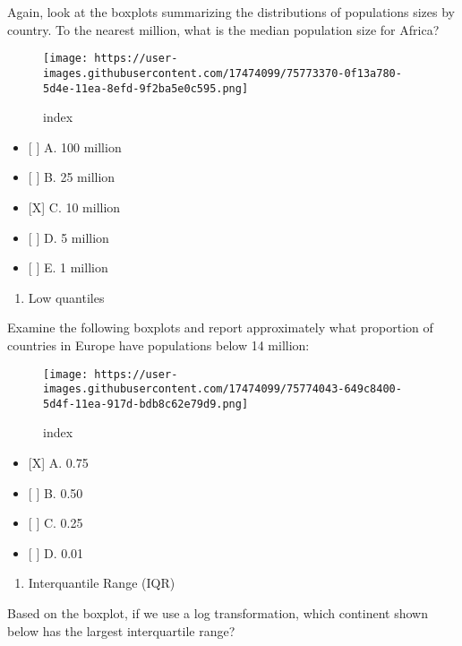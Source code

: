 \documentclass[]{article}
\providecommand{\tightlist}{%
  \setlength{\itemsep}{0pt}\setlength{\parskip}{0pt}}
\begin{document}
Again, look at the boxplots summarizing the distributions of populations
sizes by country. To the nearest million, what is the median population
size for Africa?

\begin{figure}
\centering
\texttt{[image: https://user-images.githubusercontent.com/17474099/75773370-0f13a780-5d4e-11ea-8efd-9f2ba5e0c595.png]}
\caption{index}
\end{figure}

\begin{itemize}
\tightlist
\item
  {[} {]} A. 100 million
\item
  {[} {]} B. 25 million
\item
  {[}X{]} C. 10 million
\item
  {[} {]} D. 5 million
\item
  {[} {]} E. 1 million
\end{itemize}

\begin{enumerate}
\def\labelenumi{\arabic{enumi}.}
\setcounter{enumi}{5}
\tightlist
\item
  Low quantiles
\end{enumerate}

Examine the following boxplots and report approximately what proportion
of countries in Europe have populations below 14 million:

\begin{figure}
\centering
\texttt{[image: https://user-images.githubusercontent.com/17474099/75774043-649c8400-5d4f-11ea-917d-bdb8c62e79d9.png]}
\caption{index}
\end{figure}

\begin{itemize}
\tightlist
\item
  {[}X{]} A. 0.75
\item
  {[} {]} B. 0.50
\item
  {[} {]} C. 0.25
\item
  {[} {]} D. 0.01
\end{itemize}

\begin{enumerate}
\def\labelenumi{\arabic{enumi}.}
\setcounter{enumi}{6}
\tightlist
\item
  Interquantile Range (IQR)
\end{enumerate}

Based on the boxplot, if we use a log transformation, which continent
shown below has the largest interquartile range?
\end{document}
